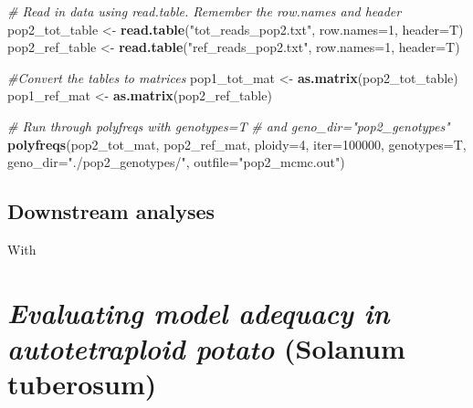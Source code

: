 \documentclass[]{article}
\newenvironment{Shaded}{\begin{snugshade}}{\end{snugshade}}
\newcommand{\KeywordTok}[1]{\textcolor[rgb]{0.13,0.29,0.53}{\textbf{{#1}}}}
\newcommand{\DataTypeTok}[1]{\textcolor[rgb]{0.13,0.29,0.53}{{#1}}}
\newcommand{\DecValTok}[1]{\textcolor[rgb]{0.00,0.00,0.81}{{#1}}}
\newcommand{\StringTok}[1]{\textcolor[rgb]{0.31,0.60,0.02}{{#1}}}
\newcommand{\CommentTok}[1]{\textcolor[rgb]{0.56,0.35,0.01}{\textit{{#1}}}}
\newcommand{\NormalTok}[1]{{#1}}
\begin{document}
\begin{Shaded}
\begin{Highlighting}[]
\CommentTok{# Read in data using read.table. Remember the row.names and header}
\NormalTok{pop2_tot_table <-}\StringTok{ }\KeywordTok{read.table}\NormalTok{(}\StringTok{"tot_reads_pop2.txt"}\NormalTok{, }\DataTypeTok{row.names=}\DecValTok{1}\NormalTok{, }\DataTypeTok{header=}\NormalTok{T)}
\NormalTok{pop2_ref_table <-}\StringTok{ }\KeywordTok{read.table}\NormalTok{(}\StringTok{"ref_reads_pop2.txt"}\NormalTok{, }\DataTypeTok{row.names=}\DecValTok{1}\NormalTok{, }\DataTypeTok{header=}\NormalTok{T)}

\CommentTok{#Convert the tables to matrices}
\NormalTok{pop1_tot_mat <-}\StringTok{ }\KeywordTok{as.matrix}\NormalTok{(pop2_tot_table)}
\NormalTok{pop1_ref_mat <-}\StringTok{ }\KeywordTok{as.matrix}\NormalTok{(pop2_ref_table)}

\CommentTok{# Run through polyfreqs with genotypes=T}
\CommentTok{# and geno_dir="pop2_genotypes"}
\KeywordTok{polyfreqs}\NormalTok{(pop2_tot_mat, pop2_ref_mat, }\DataTypeTok{ploidy=}\DecValTok{4}\NormalTok{, }
          \DataTypeTok{iter=}\DecValTok{100000}\NormalTok{, }\DataTypeTok{genotypes=}\NormalTok{T, }\DataTypeTok{geno_dir=}\StringTok{"./pop2_genotypes/"}\NormalTok{, }\DataTypeTok{outfile=}\StringTok{"pop2_mcmc.out"}\NormalTok{)}
\end{Highlighting}
\end{Shaded}

\subsection{Downstream analyses}\label{downstream-analyses}

With

\section{\texorpdfstring{\emph{Evaluating model adequacy in
autotetraploid potato} (Solanum
tuberosum)}{Evaluating model adequacy in autotetraploid potato (Solanum tuberosum)}}\label{evaluating-model-adequacy-in-autotetraploid-potato-solanum-tuberosum}
\end{document}

